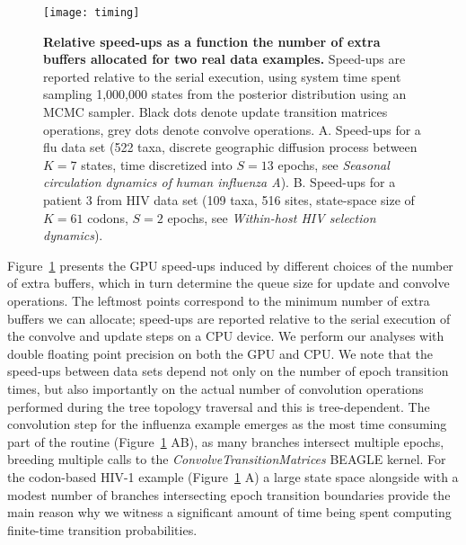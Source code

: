\begin{figure}[H]
\centering
\texttt{[image: timing]} 
\caption{
{\footnotesize 
{\bf Relative speed-ups as a function the number of extra buffers allocated for two real data examples.}
Speed-ups are reported relative to the serial execution, using system time spent sampling 1,000,000 states from the posterior distribution using an MCMC sampler. 
Black dots denote update transition matrices operations, grey dots denote convolve operations.
A. Speed-ups for a flu data set (522 taxa, discrete geographic diffusion process between $K=7$ states, time discretized into $S=13$ epochs, see {\it{Seasonal circulation dynamics of human influenza A}}). 
B. Speed-ups for a patient 3 from HIV data set (109 taxa, 516 sites, state-space size of $K=61$ codons, $S=2$ epochs, see {\it{Within-host HIV selection dynamics}}). 
} %
}
\label{fig:StackSizeTiming}
\end{figure}

Figure~\ref{fig:StackSizeTiming} presents the GPU speed-ups induced by different choices of the number of extra buffers, which in turn determine the queue size for update and convolve operations. 
The leftmost points correspond to the minimum number of extra buffers we can allocate; speed-ups are reported relative to the serial execution of the convolve and update steps on a CPU device. We perform our analyses with double floating point precision on both the GPU and CPU.
We note that the speed-ups between data sets depend not only on the number of epoch transition times, but also importantly on the actual number of convolution operations performed during the tree topology traversal and this is tree-dependent. 
The convolution step for the influenza example emerges as the most time consuming part of the routine (Figure~\ref{fig:StackSizeTiming} AB), as many branches intersect multiple epochs, breeding multiple calls to the \emph{ConvolveTransitionMatrices} BEAGLE kernel.  
For the codon-based HIV-1 example (Figure~\ref{fig:StackSizeTiming} A) a large state space alongside with a modest number of branches intersecting epoch transition boundaries provide the main reason why we witness a significant amount of time being spent computing finite-time transition probabilities. 


